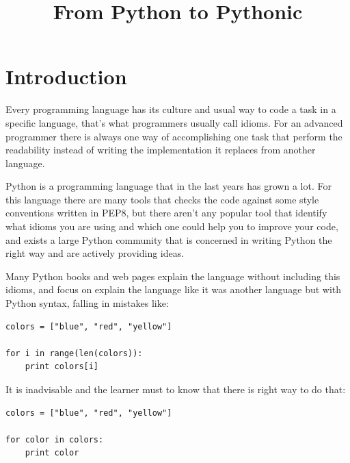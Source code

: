 \documentclass[conference]{IEEEtran}
\begin{document}
\title{From Python to Pythonic}


\author{
\and
{}
}


\maketitle
\IEEEpeerreviewmaketitle

\section{Introduction}

Every programming language has its culture and usual way to code a task in a specific language, that's what programmers usually call idioms. For an advanced programmer there is always one way of accomplishing one task that perform the readability instead of writing the implementation it replaces from another language.

Python is a programming language that in the last years has grown a lot. For this language there are many tools that checks the code against some style conventions written in PEP8, but there aren't any popular tool that identify what idioms you are using and which one could help you to improve your code, and exists a large Python community that is concerned in writing Python the right way and are actively providing ideas.

Many Python books and web pages explain the language without including this idioms, and focus on explain the language like it was another language but with Python syntax, falling in mistakes like:

\begin{verbatim}
colors = ["blue", "red", "yellow"]

for i in range(len(colors)):
    print colors[i]
\end{verbatim}

It is inadvisable and the learner must to know that there is right way to do that:

\begin{verbatim}
colors = ["blue", "red", "yellow"]

for color in colors:
    print color
\end{verbatim}
\end{document}
